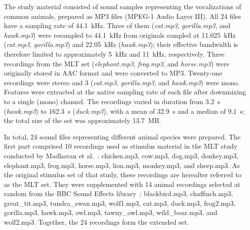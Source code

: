 \documentclass[doubleblind,preprint,12pt]{elsarticle}
\begin{document}
The study material consisted of sound samples representing the vocalizations of common animals, prepared as MP3 files (MPEG-1 Audio Layer III). All 24 files have a sampling rate of 44.1~kHz. Three of them (\textit{cat.mp3}, \textit{gorilla.mp3}, and \textit{hawk.mp3}) were resampled to 44.1~kHz from originals sampled at 11.025~kHz (\textit{cat.mp3}, \textit{gorilla.mp3}) and 22.05~kHz (\textit{hawk.mp3}); their effective bandwidth is therefore limited to approximately 5~kHz and 11~kHz, respectively. Three recordings from the MLT set (\textit{elephant.mp3}, \textit{frog.mp3}, and \textit{horse.mp3}) were originally stored in AAC format and were converted to MP3. Twenty-one recordings were stereo and 3 (\textit{cat.mp3}, \textit{gorilla.mp3}, and \textit{hawk.mp3}) were mono. Features were extracted at the native sampling rate of each file after downmixing to a single (mono) channel. The recordings varied in duration from 3.2~s (\textit{hawk.mp3}) to 162.3~s (\textit{duck.mp3}), with a mean of 32.9~s and a median of 9.1~s; the total size of the set was approximately 13.7~MB.

In total, 24 sound files representing different animal species were prepared. The first part comprised 10 recordings used as stimulus material in the MLT study conducted by Madhavan et al.~\cite{MadhavanWrobel2024MLT}: chicken.mp3, cow.mp3, dog.mp3, donkey.mp3, elephant.mp3, frog.mp3, horse.mp3, lion.mp3, monkey.mp3, and sheep.mp3. As the original stimulus set of that study, these recordings are hereafter referred to as the MLT set. They were supplemented with 14 animal recordings selected at random from the BBC Sound Effects library~\cite{bbcrewind_soundeffects}: blackbird.mp3, chaffinch.mp3, great\_tit.mp3, tundra\_swan.mp3, wolf1.mp3, cat.mp3, duck.mp3, frog2.mp3, gorilla.mp3, hawk.mp3, owl.mp3, tawny\_owl.mp3, wild\_boar.mp3, and wolf2.mp3. Together, the 24 recordings form the extended set.
\end{document}
